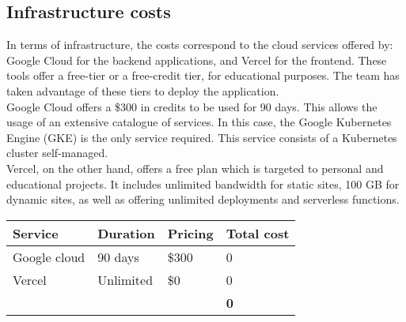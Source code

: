 \documentclass[../memory.tex]{subfiles}
\begin{document}
\subsection{Infrastructure costs}
In terms of infrastructure, the costs correspond to the cloud services offered by:
Google Cloud for the backend applications, and Vercel for the frontend. These
tools offer a free-tier or a free-credit tier, for educational purposes. The
team has taken advantage of these tiers to deploy the application.
\\[8pt]
Google Cloud offers a \$300 in credits to be used for 90 days. This allows the
usage of an extensive catalogue of services. In this case, the Google Kubernetes
Engine (GKE) is the only service required. This service consists of a Kubernetes
cluster self-managed.
\\[8pt]
Vercel, on the other hand, offers a free plan which is targeted to personal and
educational projects. It includes unlimited bandwidth for static sites, 100 GB
for dynamic sites, as well as offering unlimited deployments and serverless
functions.
\\[12pt]
\begin{tabularx}{\textwidth}{|X|X|X|X|}
	\hline
	\rowcolor{rowColor}
	Service               & Duration            & Pricing & Total cost \\
	\hline
	Google cloud          & 90 days             & \$300   & 0\texteuro \\
	\hline
	Vercel                & Unlimited           & \$0     & 0\texteuro \\
	\hline
	\multicolumn{3}{X|}{} & \textbf{0\texteuro}                        \\
	\cline{4-3}
\end{tabularx}
\end{document}
